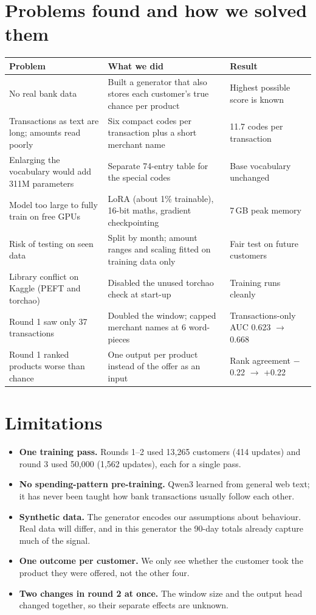 \documentclass[10pt,a4paper]{article}
\begin{document}
\section{Problems found and how we solved them}
\begin{tabularx}{\linewidth}{@{}L{3.6cm}XL{3.2cm}@{}}
\toprule
\textbf{Problem} & \textbf{What we did} & \textbf{Result} \\
\midrule
No real bank data & Built a generator that also stores each customer's true chance per product & Highest possible score is known \\
Transactions as text are long; amounts read poorly & Six compact codes per transaction plus a short merchant name & 11.7 codes per transaction \\
Enlarging the vocabulary would add 311M parameters & Separate 74-entry table for the special codes & Base vocabulary unchanged \\
Model too large to fully train on free GPUs & LoRA (about 1\% trainable), 16-bit maths, gradient checkpointing & 7\,GB peak memory \\
Risk of testing on seen data & Split by month; amount ranges and scaling fitted on training data only & Fair test on future customers \\
Library conflict on Kaggle (PEFT and torchao) & Disabled the unused torchao check at start-up & Training runs cleanly \\
Round 1 saw only 37 transactions & Doubled the window; capped merchant names at 6 word-pieces & Transactions-only AUC 0.623 $\rightarrow$ 0.668 \\
Round 1 ranked products worse than chance & One output per product instead of the offer as an input & Rank agreement $-$0.22 $\rightarrow$ +0.22 \\
\bottomrule
\end{tabularx}

\section{Limitations}
\begin{itemize}
\item \textbf{One training pass.} Rounds 1--2 used 13,265 customers (414 updates) and round 3 used 50,000 (1,562 updates), each for a single pass.
\item \textbf{No spending-pattern pre-training.} Qwen3 learned from general web text; it has never been taught how bank transactions usually follow each other.
\item \textbf{Synthetic data.} The generator encodes our assumptions about behaviour. Real data will differ, and in this generator the 90-day totals already capture much of the signal.
\item \textbf{One outcome per customer.} We only see whether the customer took the product they were offered, not the other four.
\item \textbf{Two changes in round 2 at once.} The window size and the output head changed together, so their separate effects are unknown.
\end{itemize}
\end{document}
